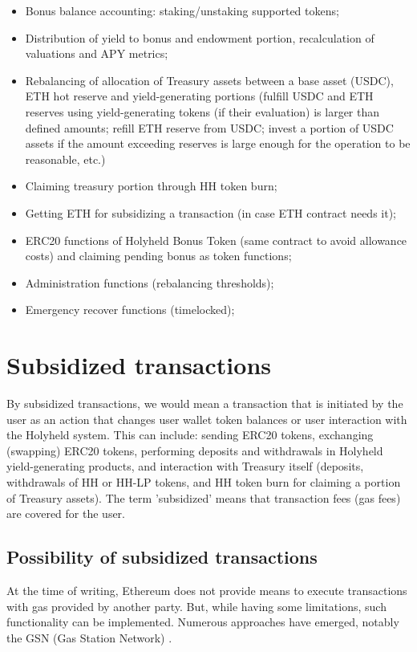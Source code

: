 \documentclass[12pt]{article}
\begin{document}
\begin{itemize}
\item Bonus balance accounting: staking/unstaking supported tokens;
\item Distribution of yield to bonus and endowment portion, recalculation of valuations and APY metrics;
\item Rebalancing of allocation of Treasury assets between a base asset (USDC), ETH hot reserve and yield-generating portions (fulfill USDC and ETH reserves using yield-generating tokens (if their evaluation) is larger than defined amounts; refill ETH reserve from USDC; invest a portion of USDC assets if the amount exceeding reserves is large enough for the operation to be reasonable, etc.)
\item Claiming treasury portion through HH token burn;
\item Getting ETH for subsidizing a transaction (in case ETH contract needs it);
\item ERC20 functions of Holyheld Bonus Token (same contract to avoid allowance costs) and claiming pending bonus as token functions;
\item Administration functions (rebalancing thresholds);
\item Emergency recover functions (timelocked);
\end{itemize}



\section{Subsidized transactions}


By subsidized transactions, we would mean a transaction that is initiated by the user as an action that changes user wallet token balances or user interaction with the Holyheld system. This can include: sending ERC20 tokens, exchanging (swapping) ERC20 tokens, performing deposits and withdrawals in Holyheld yield-generating products, and interaction with Treasury itself (deposits, withdrawals of HH or HH-LP tokens, and HH token burn for claiming a portion of Treasury assets). The term 'subsidized' means that transaction fees (gas fees) are covered for the user.


\subsection{Possibility of subsidized transactions}


At the time of writing, Ethereum does not provide means to execute transactions with gas provided by another party. But, while having some limitations, such functionality can be implemented. Numerous approaches have emerged, notably the GSN (Gas Station Network) \cite{gasstationnetwork}.
\end{document}
